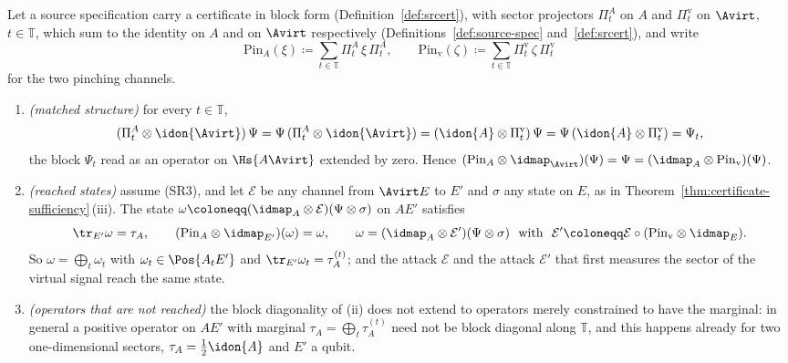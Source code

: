 \begin{lemma}\label{lem:matched-pinching}
Let a source specification carry a certificate in block form
(Definition~\ref{def:srcert}), with sector projectors $\Pi^{A}_t$ on $A$ and
$\Pi^{\mathrm v}_t$ on $\Avirt$, $t\in\mathbb{T}$, which sum to the identity
on $A$ and on $\Avirt$ respectively (Definitions~\ref{def:source-spec}
and~\ref{def:srcert}), and write
\begin{equation*}
  \mathrm{Pin}_{A}(\xi)\coloneqq\sum_{t\in\mathbb{T}}\Pi^{A}_t\,\xi\,\Pi^{A}_t ,
  \qquad
  \mathrm{Pin}_{\mathrm v}(\zeta)\coloneqq
  \sum_{t\in\mathbb{T}}\Pi^{\mathrm v}_t\,\zeta\,\Pi^{\mathrm v}_t
\end{equation*}
for the two pinching channels.
\begin{enumerate}[label=(\roman*),leftmargin=2.2em]
\item \emph{(matched structure)} for every $t\in\mathbb{T}$,
\begin{equation}\label{eq:matched}
  (\Pi^{A}_t\otimes\idon{\Avirt})\,\Psi
  =\Psi\,(\Pi^{A}_t\otimes\idon{\Avirt})
  =(\idon{A}\otimes\Pi^{\mathrm v}_t)\,\Psi
  =\Psi\,(\idon{A}\otimes\Pi^{\mathrm v}_t)
  =\Psi_t ,
\end{equation}
the block $\Psi_t$ read as an operator on $\Hs{A\Avirt}$ extended by zero.
Hence
$(\mathrm{Pin}_{A}\otimes\idmap_{\Avirt})(\Psi)=\Psi
=(\idmap_{A}\otimes\mathrm{Pin}_{\mathrm v})(\Psi)$.
\item \emph{(reached states)} assume (SR3), and let $\mathcal{E}$ be any
channel from $\Avirt E$ to $E'$ and $\sigma$ any state on $E$, as in
Theorem~\ref{thm:certificate-sufficiency}\,(iii). The state
$\omega\coloneqq(\idmap_{A}\otimes\mathcal{E})(\Psi\otimes\sigma)$ on $AE'$
satisfies
\begin{equation}\label{eq:reached}
  \tr_{E'}\omega=\tau_A ,\qquad
  (\mathrm{Pin}_{A}\otimes\idmap_{E'})(\omega)=\omega ,\qquad
  \omega=(\idmap_{A}\otimes\mathcal{E}')(\Psi\otimes\sigma)
  \ \text{ with }\
  \mathcal{E}'\coloneqq\mathcal{E}\circ(\mathrm{Pin}_{\mathrm v}\otimes\idmap_{E}) .
\end{equation}
So $\omega=\bigoplus_t\omega_t$ with $\omega_t\in\Pos{A_tE'}$ and
$\tr_{E'}\omega_t=\tau^{(t)}_A$; and the attack $\mathcal{E}$ and the attack
$\mathcal{E}'$ that first measures the sector of the virtual signal reach
the same state.
\item \emph{(operators that are not reached)} the block diagonality of (ii)
does not extend to operators merely constrained to have the marginal: in
general a positive operator on $AE'$ with marginal
$\tau_A=\bigoplus_t\tau^{(t)}_A$ need not be block diagonal along
$\mathbb{T}$, and this happens already for two one-dimensional sectors,
$\tau_A=\tfrac12\idon{A}$ and $E'$ a qubit.
\end{enumerate}
\end{lemma}

